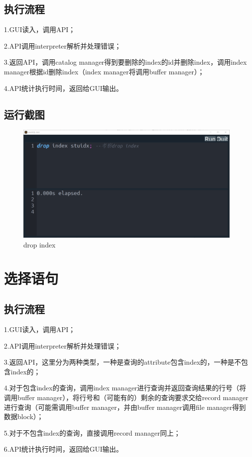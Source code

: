 \documentclass[UTF8]{ctexrep} %
\begin{document}
\subsection{执行流程}
1.GUI读入，调用API；
\par
2.API调用interpreter解析并处理错误；
\par
3.返回API，调用catalog manager得到要删除的index的id并删除index，调用index manager根据id删除index（index manager将调用buffer manager）；
\par
4.API统计执行时间，返回给GUI输出。
\subsection{运行截图}
\begin{figure}[H]
    \centering
    \includegraphics[width=0.8\linewidth]{figure/4.1.png}
    \caption{drop index}
    \label{fig:runtime4.1}
\end{figure}
\section{选择语句}
\subsection{执行流程}
1.GUI读入，调用API；
\par
2.API调用interpreter解析并处理错误；
\par
3.返回API，这里分为两种类型，一种是查询的attribute包含index的，一种是不包含index的；
\par
4.对于包含index的查询，调用index manager进行查询并返回查询结果的行号（将调用buffer manager），将行号和（可能有的）剩余的查询要求交给record manager进行查询（可能需调用buffer manager，并由buffer manager调用file manager得到数据block）；
\par
5.对于不包含index的查询，直接调用record manager同上；
\par
6.API统计执行时间，返回给GUI输出。
\end{document}
